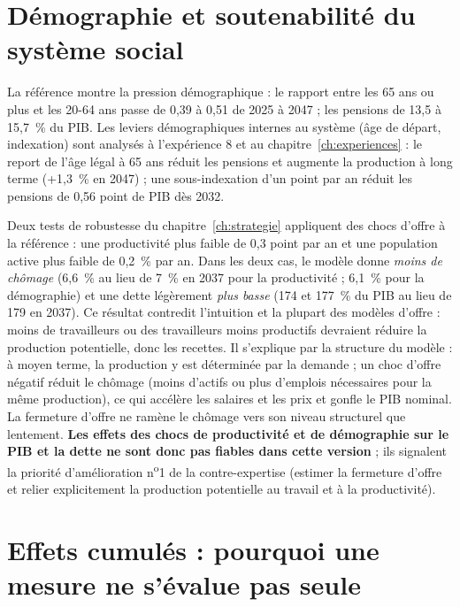 \section{Démographie et soutenabilité du système social}
\label{sec:paradoxe}

La référence montre la pression démographique : le rapport entre les 65 ans ou plus et les 20-64 ans passe de 0,39 à
0,51 de 2025 à 2047 ; les pensions de 13,5 à 15,7~\% du PIB. Les leviers démographiques internes au système
(âge de départ, indexation) sont analysés à l'expérience 8 et au chapitre~\ref{ch:experiences} : le report de l'âge
légal à 65 ans réduit les pensions et augmente la production à long terme (+1,3~\% en 2047) ; une sous-indexation d'un
point par an réduit les pensions de 0,56 point de PIB dès 2032.

\begin{limites}
Deux tests de robustesse du chapitre~\ref{ch:strategie} appliquent des chocs d'offre à la référence : une productivité plus
faible de 0,3 point par an et une population active plus faible de 0,2~\% par an. Dans les deux cas, le modèle donne
\emph{moins de chômage} (6,6~\% au lieu de 7~\% en 2037 pour la productivité ; 6,1~\% pour la démographie) et une dette
légèrement \emph{plus basse} (174 et 177~\% du PIB au lieu de 179 en 2037). Ce résultat contredit l'intuition et la
plupart des modèles d'offre : moins de travailleurs ou des travailleurs moins productifs devraient réduire la production
potentielle, donc les recettes. Il s'explique par la structure du modèle : à moyen terme, la production y est
déterminée par la demande ; un choc d'offre négatif réduit le chômage (moins d'actifs ou plus d'emplois nécessaires pour
la même production), ce qui accélère les salaires et les prix et gonfle le PIB nominal. La fermeture d'offre ne ramène
le chômage vers son niveau structurel que lentement. \textbf{Les effets des chocs de productivité et de démographie sur
le PIB et la dette ne sont donc pas fiables dans cette version}  ; ils signalent la priorité
d'amélioration n\textsuperscript{o}1 de la contre-expertise (estimer la fermeture d'offre et relier explicitement
la production potentielle au travail et à la productivité).
\end{limites}

\section{Effets cumulés : pourquoi une mesure ne s'évalue pas seule}
\label{sec:interactions}

